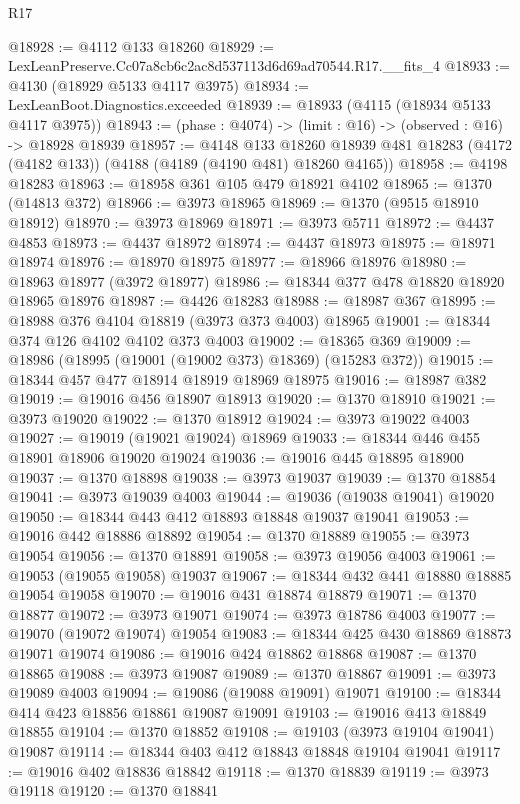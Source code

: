 \begin{lexlean}{R17}
\begin{coremodule}
@18928 := @4112 @133 @18260
@18929 := LexLeanPreserve.Cc07a8cb6c2ac8d537113d6d69ad70544.R17.__fits_4
@18933 := @4130 (@18929 @5133 @4117 @3975)
@18934 := LexLeanBoot.Diagnostics.exceeded
@18939 := @18933 (@4115 (@18934 @5133 @4117 @3975))
@18943 := (phase : @4074) -> (limit : @16) -> (observed : @16) -> @18928 @18939
@18957 := @4148
    @133
    @18260
    @18939
    @481
    @18283
    (@4172 (@4182 @133))
    (@4188 (@4189 (@4190 @481) @18260 @4165))
@18958 := @4198 @18283
@18963 := @18958 @361 @105 @479 @18921 @4102
@18965 := @1370 (@14813 @372)
@18966 := @3973 @18965
@18969 := @1370 (@9515 @18910 @18912)
@18970 := @3973 @18969
@18971 := @3973 @5711
@18972 := @4437 @4853
@18973 := @4437 @18972
@18974 := @4437 @18973
@18975 := @18971 @18974
@18976 := @18970 @18975
@18977 := @18966 @18976
@18980 := @18963 @18977 (@3972 @18977)
@18986 := @18344 @377 @478 @18820 @18920 @18965 @18976
@18987 := @4426 @18283
@18988 := @18987 @367
@18995 := @18988 @376 @4104 @18819 (@3973 @373 @4003) @18965
@19001 := @18344 @374 @126 @4102 @4102 @373 @4003
@19002 := @18365 @369
@19009 := @18986 (@18995 (@19001 (@19002 @373) @18369) (@15283 @372))
@19015 := @18344 @457 @477 @18914 @18919 @18969 @18975
@19016 := @18987 @382
@19019 := @19016 @456 @18907 @18913
@19020 := @1370 @18910
@19021 := @3973 @19020
@19022 := @1370 @18912
@19024 := @3973 @19022 @4003
@19027 := @19019 (@19021 @19024) @18969
@19033 := @18344 @446 @455 @18901 @18906 @19020 @19024
@19036 := @19016 @445 @18895 @18900
@19037 := @1370 @18898
@19038 := @3973 @19037
@19039 := @1370 @18854
@19041 := @3973 @19039 @4003
@19044 := @19036 (@19038 @19041) @19020
@19050 := @18344 @443 @412 @18893 @18848 @19037 @19041
@19053 := @19016 @442 @18886 @18892
@19054 := @1370 @18889
@19055 := @3973 @19054
@19056 := @1370 @18891
@19058 := @3973 @19056 @4003
@19061 := @19053 (@19055 @19058) @19037
@19067 := @18344 @432 @441 @18880 @18885 @19054 @19058
@19070 := @19016 @431 @18874 @18879
@19071 := @1370 @18877
@19072 := @3973 @19071
@19074 := @3973 @18786 @4003
@19077 := @19070 (@19072 @19074) @19054
@19083 := @18344 @425 @430 @18869 @18873 @19071 @19074
@19086 := @19016 @424 @18862 @18868
@19087 := @1370 @18865
@19088 := @3973 @19087
@19089 := @1370 @18867
@19091 := @3973 @19089 @4003
@19094 := @19086 (@19088 @19091) @19071
@19100 := @18344 @414 @423 @18856 @18861 @19087 @19091
@19103 := @19016 @413 @18849 @18855
@19104 := @1370 @18852
@19108 := @19103 (@3973 @19104 @19041) @19087
@19114 := @18344 @403 @412 @18843 @18848 @19104 @19041
@19117 := @19016 @402 @18836 @18842
@19118 := @1370 @18839
@19119 := @3973 @19118
@19120 := @1370 @18841

\end{coremodule}
\end{lexlean}

